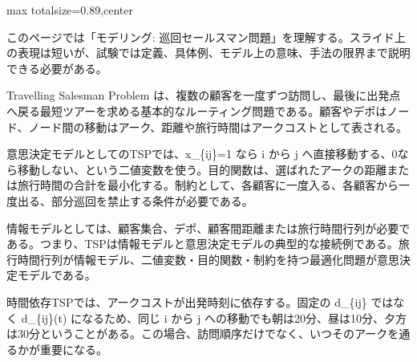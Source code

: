 \begin{minipage}[t]{0.58\textwidth}
\begin{adjustbox}{max totalsize={\textwidth}{0.89\textheight},center}
\begin{minipage}{\textwidth}\scriptsize
{}このページでは「モデリング: 巡回セールスマン問題」を理解する。スライド上の表現は短いが、試験では定義、具体例、モデル上の意味、手法の限界まで説明できる必要がある。\par
Travelling Salesman Problem は、複数の顧客を一度ずつ訪問し、最後に出発点へ戻る最短ツアーを求める基本的なルーティング問題である。顧客やデポはノード、ノード間の移動はアーク、距離や旅行時間はアークコストとして表される。\par
意思決定モデルとしてのTSPでは、x\_\{ij\}=1 なら i から j へ直接移動する、0なら移動しない、という二値変数を使う。目的関数は、選ばれたアークの距離または旅行時間の合計を最小化する。制約として、各顧客に一度入る、各顧客から一度出る、部分巡回を禁止する条件が必要である。\par
情報モデルとしては、顧客集合、デポ、顧客間距離または旅行時間行列が必要である。つまり、TSPは情報モデルと意思決定モデルの典型的な接続例である。旅行時間行列が情報モデル、二値変数・目的関数・制約を持つ最適化問題が意思決定モデルである。\par
時間依存TSPでは、アークコストが出発時刻に依存する。固定の d\_\{ij\} ではなく d\_\{ij\}(t) になるため、同じ i から j への移動でも朝は20分、昼は10分、夕方は30分ということがある。この場合、訪問順序だけでなく、いつそのアークを通るかが重要になる。\par

\end{minipage}
\end{adjustbox}
\end{minipage}
